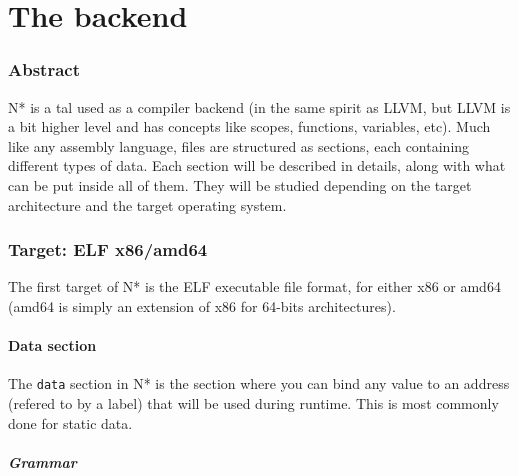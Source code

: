 \part{The backend}\label{part:nstar}

\setcounter{chapter}{1}

\section{Abstract}\label{sec:nstar-abstract}

N* is a \gls{tal} used as a compiler backend (in the same spirit as LLVM, but LLVM is a bit higher level and has concepts like scopes, functions, variables, etc).
Much like any assembly language, files are structured as sections, each containing different types of data.
Each section will be described in details, along with what can be put inside all of them.
They will be studied depending on the target architecture and the target operating system.

\section{Target: ELF x86/amd64}\label{subsec:elfx86amd64}

The first target of N* is the ELF executable file format, for either x86 or amd64 (amd64 is simply an extension of x86 for 64-bits architectures).

\subsection{Data section}\label{subsubsec:elf86amd64-data}

The \texttt{data} section in N* is the section where you can bind any value to an address (refered to by a label) that will be used during runtime.
This is most commonly done for static data.

\subsubsection{Grammar}\label{subsubsubsec:elf86amd64-data-grammar}

\begin{figure}[h]
  \centering
\end{figure}
